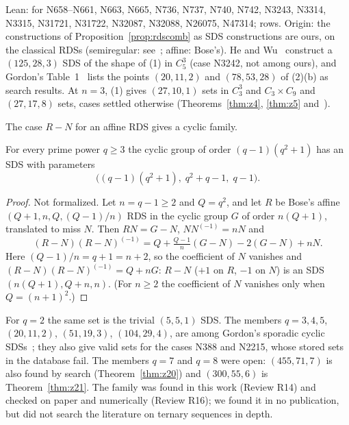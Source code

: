 \begin{remark}
Lean:  for N658--N661, N663, N665, N736, N737, N740, N742, N3243,
N3314, N3315, N31721, N31722, N32087, N32088, N26075, N47314;  rows. Origin: the
constructions of Proposition~\ref{prop:rdscomb} as SDS constructions are ours, on the classical
RDSs (semiregular: see~\cite{pott}; affine: Bose's). He and Wu~\cite[Thm.~5.6]{he-wu} construct
a $(125, 28, 3)$ SDS of the shape of (1) in $C_5^3$ (case N3242, not among ours), and
Gordon's Table~1~\cite{gordon} lists the points $(20, 11, 2)$ and $(78, 53, 28)$ of (2)(b) as
search results. At $n = 3$, (1) gives $(27, 10, 1)$ sets in $C_3^3$ and $C_3 \times C_9$ and
$(27, 17, 8)$ sets, cases settled otherwise (Theorems~\ref{thm:z4}, \ref{thm:z5}
and~\cite[Thm.~4.1]{gordon}).
\end{remark}

The case $R - N$ for an affine RDS gives a cyclic family.

\begin{theorem}\label{thm:rdsfamily}
For every prime power $q \ge 3$ the cyclic group of order $(q-1)(q^2+1)$ has an SDS with
parameters
\[
  \bigl((q-1)(q^2+1),\; q^2 + q - 1,\; q - 1\bigr).
\]
\end{theorem}

\begin{proof}
Not formalized. Let $n = q - 1 \ge 2$ and $Q = q^2$, and let $R$ be Bose's affine
$(Q + 1, n, Q, (Q-1)/n)$ RDS in the cyclic group $G$ of order $n(Q+1)$, translated to miss
$N$. Then $RN = G - N$, $NN^{(-1)} = nN$ and
\[
  (R - N)(R - N)^{(-1)} = Q + \tfrac{Q-1}{n}(G - N) - 2(G - N) + nN .
\]
Here $(Q - 1)/n = q + 1 = n + 2$, so the coefficient of $N$ vanishes and
$(R - N)(R - N)^{(-1)} = Q + nG$: $R - N$ ($+1$ on $R$, $-1$ on $N$) is an SDS
$(n(Q+1), Q + n, n)$. (For $n \ge 2$ the coefficient of $N$ vanishes only when
$Q = (n+1)^2$.)
\end{proof}

\begin{remark}
For $q = 2$ the same set is the trivial $(5, 5, 1)$ SDS. The members $q = 3, 4, 5$,
$(20, 11, 2)$, $(51, 19, 3)$, $(104, 29, 4)$, are among Gordon's sporadic cyclic
SDSs~\cite[Table~1]{gordon}; they also give valid sets for the cases N388 and N2215, whose
stored sets in the database fail. The members $q = 7$ and $q = 8$ were open: $(455, 71, 7)$ is
also found by search (Theorem~\ref{thm:z20}) and $(300, 55, 6)$ is Theorem~\ref{thm:z21}. The
family was found in this work (Review R14) and checked on paper and numerically (Review R16);
we found it in no publication, but did not search the literature on ternary sequences in
depth.
\end{remark}

